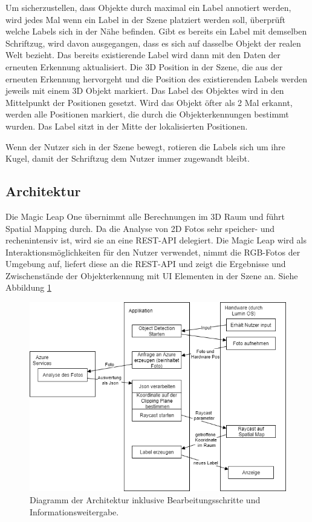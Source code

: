 Um sicherzustellen, dass Objekte durch maximal ein Label annotiert werden, wird jedes Mal wenn ein Label in der Szene platziert werden soll, überprüft welche Labels sich in der Nähe befinden. Gibt es bereits ein Label mit demselben Schriftzug, wird davon ausgegangen, dass es sich auf dasselbe Objekt der realen Welt bezieht. Das bereits existierende Label wird dann mit den Daten der erneuten Erkennung aktualisiert. Die 3D Position in der Szene, die aus der erneuten Erkennung hervorgeht und die Position des existierenden Labels werden jeweils mit einem 3D Objekt markiert. Das Label des Objektes wird in den Mittelpunkt der Positionen gesetzt. Wird das Objekt öfter als 2 Mal erkannt, werden alle Positionen markiert, die durch die Objekterkennungen bestimmt wurden. Das Label sitzt in der Mitte der lokalisierten Positionen.

Wenn der Nutzer sich in der Szene bewegt, rotieren die Labels sich um ihre Kugel, damit der Schriftzug dem Nutzer immer zugewandt bleibt.

\subsection{Architektur}

Die Magic Leap One übernimmt alle Berechnungen im 3D Raum und führt Spatial Mapping durch. Da die Analyse von 2D Fotos sehr speicher- und rechenintensiv ist, wird sie an eine REST-API delegiert. Die Magic Leap wird als Interaktionsmöglichkeiten für den Nutzer verwendet, nimmt die RGB-Fotos der Umgebung auf, liefert diese an die REST-API und zeigt die Ergebnisse und Zwischenstände der Objekterkennung mit UI Elementen in der Szene an. Siehe Abbildung \ref{dia:flow}

\begin{figure}[H]
	\centering
	\includegraphics[width=1\textwidth]{images/dia_flow.png}
	\caption[Diagramm der Architektur]{Diagramm der Architektur inklusive Bearbeitungsschritte und Informationsweitergabe.}
	\label{dia:flow}
\end{figure}

